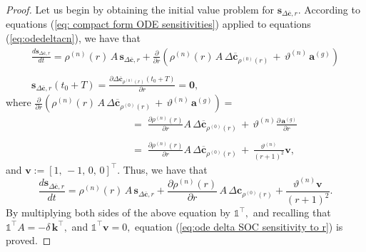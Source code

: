  \begin{proof}
 Let us begin by obtaining the initial value problem for $\mathbf{s}_{\Delta \mathbf{\overline c},r}$. According to equations (\ref{eq: compact form ODE sensitivities})  applied to equations (\ref{eq:odedeltacn}), we have that
\begin{equation}\label{eq:ivp sens delta c to r}
\begin{array}{l}
\displaystyle \frac{d\mathbf{s}_{\Delta \mathbf{\overline c},r}}{dt}= \rho^{(n)}(r) \, A\, \mathbf{s}_{\Delta \mathbf{\overline c},r}
+
\displaystyle \frac{\partial}{\partial r}\left(\rho^{(n)}(r) \,  A \, \Delta \mathbf{\overline c}_{\rho^{(0)}(r)}\,+\,\vartheta^{(n)}\,  \mathbf{a}^{(g)} \right)
\\\\
\mathbf{s}_{\Delta \mathbf{\overline c},r} (t_0+T)=\displaystyle \frac{\partial \Delta\mathbf{\overline c}_{\rho^{(0)}(r)}(t_0+T)}{\partial r}=  \mathbf{0},
\end{array}
\end{equation}
where
$\displaystyle \frac{\partial}{\partial r}\left(\rho^{(n)}(r)\,  A \, \Delta \mathbf{\overline c}_{\rho^{(0)}(r)}\,+\,\vartheta^{(n)}\,  \mathbf{a}^{(g)} \right)=$
$$\begin{array}{ll}
\qquad\qquad\quad&=\;  \displaystyle \frac{\partial \rho^{(n)}(r)  }{\partial r}  A \, \Delta \mathbf{\overline c}_{\rho^{(0)}(r)}\,+\, \vartheta^{(n)}\displaystyle \frac{\partial \, \mathbf{a}^{(g)}}{\partial r} \\\\
&=\; \displaystyle \frac{\partial \rho^{(n)}(r)  }{\partial r}  A \, \Delta \mathbf{\overline c}_{\rho^{(0)}(r)}\,+\, \displaystyle \frac{\vartheta^{(n)}}{(r+1)^2}\mathbf{v},
\end{array}$$
and $\mathbf{v}:= [1,\, -1,\, 0,\, 0]^\intercal$. Thus, we have that
$$
\displaystyle \frac{d\mathbf{s}_{\Delta \mathbf{\overline c},r}}{dt}= \rho^{(n)}(r) \,A\, \mathbf{s}_{\Delta \mathbf{\overline c},r} + \displaystyle \frac{\partial\rho^{(n)}(r)}{\partial r}\, A\, \Delta \mathbf{c}_{\rho^{(0)}(r)} +  \displaystyle \frac{\vartheta^{(n)}\mathbf{v}}{(r+1)^2}.$$
By multiplying both sides of the above equation by $\mathds{1}^\intercal,$ and recalling that $\mathds{1}^\intercal A = -\delta \, \mathbf{k}^\intercal,$ and $ \mathds{1}^\intercal \mathbf{v}=0,$ equation (\ref{eq:ode delta SOC sensitivity to r}) is proved.


\end{proof}
